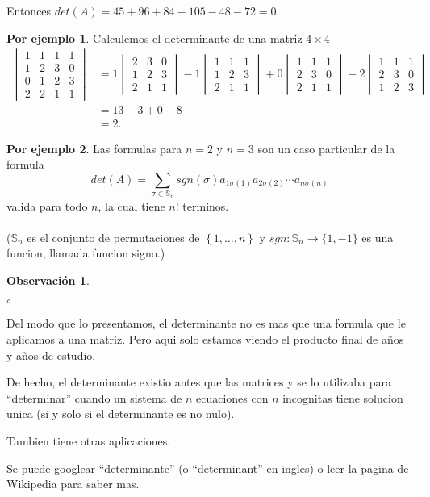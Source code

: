 \documentclass{article}
\theoremstyle{definition}
\theoremstyle{definition}
\newtheorem*{obs}{Observación}
\newtheorem*{ej}{Por ejemplo}
\theoremstyle{remark}
\begin{document}
Entonces $det(A)=45+96+84-105-48-72=0$.
\begin{ej}
  Calculemos el determinante de una matriz $ 4 \times 4$ \[\begin{aligned}
\begin{vmatrix}1 & 1 & 1 & 1 \\ 1 & 2 & 3 & 0 \\ 0 & 1 & 2 & 3 \\ 2 & 2 & 1 & 1 \end{vmatrix}
                     &= 1 \begin{vmatrix}2 & 3 & 0 \\ 1 & 2 & 3 \\ 2 & 1 & 1 \end{vmatrix} - 1 \begin{vmatrix}1 & 1 &1 \\ 1 & 2 & 3 \\ 2 & 1 & 1 \end{vmatrix} + 0 \begin{vmatrix}1 & 1 & 1 \\ 2 & 3 & 0 \\ 2 & 1 & 1 \end{vmatrix} -2 \begin{vmatrix} 1 & 1 & 1 \\ 2 & 3 & 0 \\ 1 & 2 & 3 \end{vmatrix} \\
                     &=13-3+0-8 \\
                     &=2.
  \end{aligned}
  \]
\end{ej}
\begin{ej}
  Las formulas para $n=2$ y $n=3$ son un caso particular de la formula \[
det(A)=\sum_{\sigma \in \mathbb{S}_{n}}sgn(\sigma)a_{1\sigma(1)}a_{2\sigma(2)}\cdots a_{n\sigma(n)}
  \]
  valida para todo $n$, la cual tiene $n!$ terminos.\\\\
  ($\mathbb{S}_{n}$ es el conjunto de permutaciones de $\left\{1,\dots,n\right\}$ y $sgn : \mathbb{S}_{n} \to \{1,-1\}$ es una funcion, llamada funcion signo.)
\end{ej}
\begin{obs}\;
  \begin{list}{$\circ$}{}  
\item Del modo que lo presentamos, el determinante no es mas que una formula que le aplicamos a una matriz. Pero aqui solo estamos viendo el producto final de años y años de estudio.
\item De hecho, el determinante existio antes que las matrices y se lo utilizaba para ``determinar'' cuando un sistema de $n$ ecuaciones con $n$ incognitas tiene solucion unica (si y solo si el determinante es no nulo).
\item Tambien tiene otras aplicaciones. 
\item Se puede googlear ``determinante'' (o ``determinant'' en ingles) o leer la pagina de Wikipedia para saber mas.
\end{list}
\end{obs}
\end{document}
